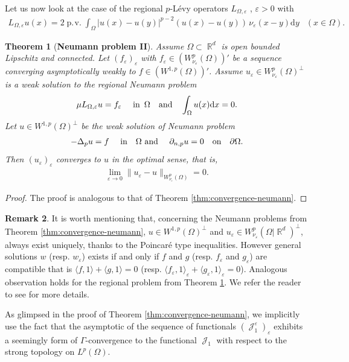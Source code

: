 \documentclass[12pt, reqno]{amsart}%
\theoremstyle{plain}  %
\newtheorem{theorem}{Theorem}[section]
\theoremstyle{definition}  %
\newtheorem{remark}[theorem]{Remark}   %
\numberwithin{equation}{section}
\DeclareMathOperator{\pv}{\operatorname{p.\!v.}}
\DeclareMathOperator{\cJ}{\mathcal{J}}
\DeclareMathOperator{\R}{\mathbb{R}}
\renewcommand{\d}{\mathrm{d}}
\newcommand{\eps}{\varepsilon}
\newcommand{\WnuOmRa}{W^p_{\nu_\eps}(\Omega|\R^d )}
\newcommand{\WnuOma}{W^{p}_{\nu_\eps}(\Omega)}
\begin{document}
Let us now look at the case of the regional $p$-L{\'e}vy operators $L_{\Omega,\eps}$ , $\eps>0$ with
\begin{align*}
L_{\Omega,\eps}u(x)= 2\pv \int_{\Omega} |u(x)-u(y)|^{p-2}(u(x)-u(y))\, \nu_\eps(x-y)\d y&& (x\in \Omega).
\end{align*}
\begin{theorem}[\textbf{Neumann problem II}]\label{thm:convergence-neumann regional}
Assume $\Omega\subset \R^d$ is open bounded Lipschitz and connected. Let $ (f_\eps)_\eps$ with  $f_\eps\in  (W^{p}_{\nu_\eps}(\Omega))'$ be a sequence  converging asymptotically weakly to  $f\in (W^{1,p}(\Omega))'$. Assume $u_\eps \in  \WnuOma^\perp$ is  a weak solution to the regional Neumann problem
\begin{align*}
\mu L_{\Omega,\eps} u= f_\eps \quad \text{ in \,$\Omega$ \,\, and} \quad  \int_\Omega u(x)\d x=0 .
\end{align*}
Let $u\in W^{1,p}(\Omega)^\perp$ be the  weak solution of Neumann problem
\begin{align*}
-\Delta_p u=f\quad \text{ in \,\, $\Omega$ and }\quad  \partial_{n,p} u=0\quad \text{on \,\, $\partial\Omega$}.
\end{align*}
\noindent Then $(u_\eps)_\eps$ converges to $u$ in the optimal sense, that is,
\begin{align*}
\lim_{\eps\to0}\|u_\eps-u\|_{\WnuOma}=0.
\end{align*}
\end{theorem}

\begin{proof}
The proof is analogous to that of Theorem \ref{thm:convergence-neumann}.
\end{proof}

\begin{remark}
It is worth mentioning that,  concerning the Neumann problems from Theorem \ref{thm:convergence-neumann}, $u\in W^{1,p}(\Omega)^\perp$ and $u_\eps\in\WnuOmRa^\perp$, always exist uniquely, thanks to the Poincar\'{e} type inequalities. However general solutions $w$ (resp. $w_\eps$) exists if and only if $f$ and $g$ (resp. $f_\eps$ and $g_\eps$) are compatible that is $	\langle f, 1\rangle+\langle g, 1\rangle=0$ (resp. $\langle f_\eps, 1\rangle_\eps+\langle g_\eps,  1\rangle_\eps =0$). Analogous observation holds for the regional problem from Theorem \ref{thm:convergence-neumann regional}. We refer the reader to see \cite{Fog25} for more details.
\end{remark}

As glimpsed in the proof of Theorem \ref{thm:convergence-neumann},  we implicitly use the fact that the asymptotic of the sequence of functionals $(\cJ^\eps_1)_\eps$ exhibits a seemingly form of $\Gamma$-convergence to the functional $\cJ_1$ with respect to the strong topology on  $L^p(\Omega)$.
\end{document}
